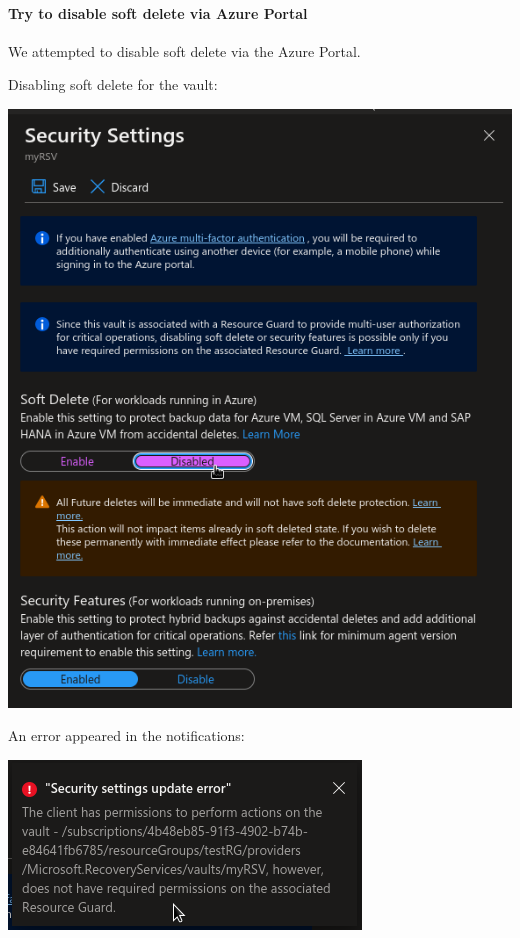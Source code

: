 \paragraph{Try to disable soft delete via Azure Portal}
\label{sec:orgf58e754}
We attempted to disable soft delete via the Azure Portal.

Disabling soft delete for the vault:
\begin{center}
\includegraphics[width=.9\linewidth]{figures/mua/disable_soft_delete.png}
\end{center}

An error appeared in the notifications:
\begin{center}
\includegraphics[width=.9\linewidth]{figures/mua/error_mua.png}
\end{center}


